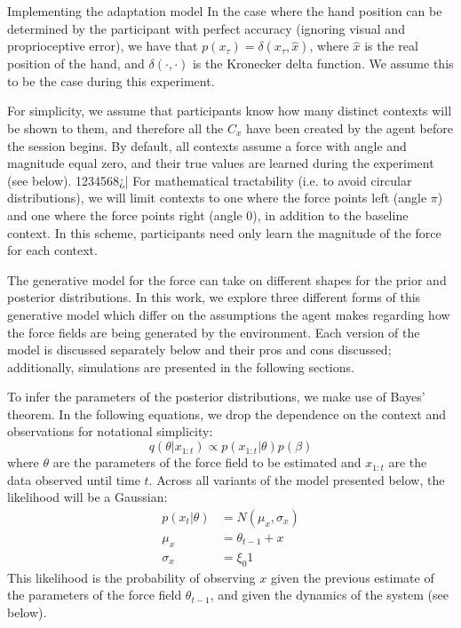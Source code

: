 \documentclass{report}
\begin{document}
\begin{chapter}{Implementing the adaptation model}
In the case where the hand position can be determined by the participant with
perfect accuracy (ignoring visual and proprioceptive error), we have that
$p(x_\tau) = \delta(x_\tau, \hat x)$, where $\hat x$ is the real position of
the hand, and $\delta (\cdot, \cdot)$ is the Kronecker delta function. We
assume this to be the case during this experiment.

  For simplicity, we assume that participants know how many distinct contexts
will be shown to them, and therefore all the $C_x$ have been created by the
agent before the session begins. By default, all contexts assume a force with
angle and magnitude equal zero, and their true values are learned during the
experiment (see below).
1234568¿|
For mathematical tractability (i.e. to avoid circular distributions), we will
limit contexts to one where the force points left (angle $\pi$) and one where
the force points right (angle 0), in addition to the baseline context. In this
scheme, participants need only learn the magnitude of the force for each
context.

The generative model for the force can take on different shapes for the prior
and posterior distributions. In this work, we explore three different forms of
this generative model which differ on the assumptions the agent makes regarding
how the force fields are being generated by the environment. Each version of
the model is discussed separately below and their pros and cons discussed;
additionally, simulations are presented in the following sections.

To infer the parameters of the posterior distributions, we make use of Bayes'
theorem. In the following equations, we drop the dependence on the context and
observations for notational simplicity:
\begin{equation}
q(\theta | x_{1:t}) \propto p(x_{1:t} | \theta)p(\beta)
\end{equation}
where $\theta$ are the parameters of the force field to be estimated and
$x_{1:t}$ are the data observed until time $t$. Across all variants of the
model presented below, the likelihood will be a Gaussian:
\begin{align}
  p(x_t | \theta) &= N(\mu_x, \sigma_x)  \\
  \mu_x &= \theta_{t-1} + x \\
  \sigma_x &= \xi_0 1
\end{align}
This likelihood is the probability of observing $x$ given the previous estimate
of the parameters of the force field $\theta_{t-1}$, and given the dynamics of
the system (see below).


\end{chapter}
\end{document}
